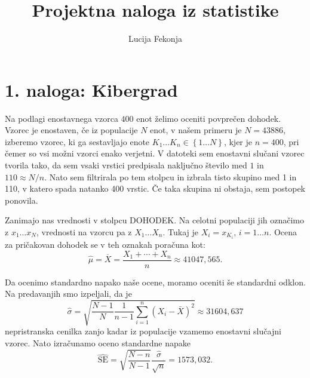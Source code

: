 \documentclass{article}
\author{Lucija Fekonja}
\title{Projektna naloga iz statistike}
\begin{document}
\maketitle

\section*{1. naloga: Kibergrad}
Na podlagi enostavnega vzorca $400$ enot želimo oceniti povprečen dohodek.
Vzorec je enostaven, če iz populacije $N$ enot, v našem primeru je $N = 43886$,
izberemo vzorec, ki ga sestavljajo enote $K_1 \dots K_n \in \left\{ 1 \dots N \right\}$,
kjer je $n = 400$, pri čemer so vsi možni vzorci enako verjetni. V datoteki 
 sem enostavni slučani vzorec tvorila tako, da sem vsaki vrstici 
predpisala naključno število med $1$ in $110 \approx N / n$. Nato sem filtrirala 
po tem stolpcu in izbrala tisto skupino med 1 in 110, v katero spada natanko 400 vrstic. 
Če taka skupina ni obstaja, sem postopek ponovila.

Zanimajo nas vrednosti v stolpcu DOHODEK. Na celotni populaciji jih označimo
z $x_1 \dots x_N$, vrednosti na vzorcu pa z $X_1 \dots  X_n$. Tukaj je 
$X_i = x_{K_i}\text{, } i = 1 \dots n$. Ocena za pričakovan dohodek se v teh oznakah
poračuna kot:
$$ \hat{\mu} = \overline{X} = \frac{X_1 + \cdots + X_n}{n} \approx 41047{,}565 \text{.}$$

Da ocenimo standardno napako naše ocene, moramo oceniti še standardni odklon. Na predavanjih 
smo izpeljali, da je 
$$ \hat{\sigma} = \sqrt{\frac{N-1}{N} \frac{1}{n-1} \sum_{i=1}^{n} \left( X_i - \bar{X} \right)^2} \approx 31604{,}637$$
nepristranska cenilka zanjo kadar iz populacije vzamemo enostavni slučajni vzorec. Nato izračunamo oceno standardne napake
$$ \widehat{\text{SE}} = \sqrt{\frac{N-n}{N-1}} \frac{\hat{\sigma}}{\sqrt{n}} = 1573{,}032\text{.}$$
\end{document}
